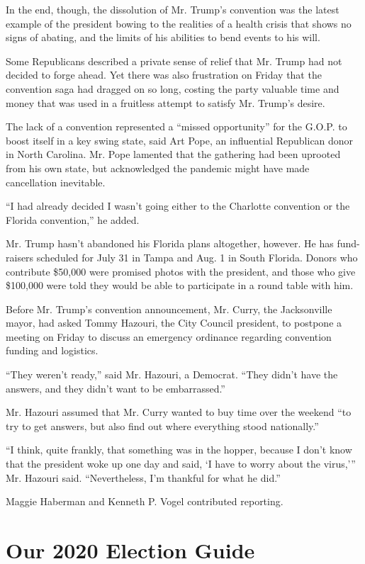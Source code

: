 In the end, though, the dissolution of Mr. Trump's convention was the
latest example of the president bowing to the realities of a health
crisis that shows no signs of abating, and the limits of his abilities
to bend events to his will.

Some Republicans described a private sense of relief that Mr. Trump had
not decided to forge ahead. Yet there was also frustration on Friday
that the convention saga had dragged on so long, costing the party
valuable time and money that was used in a fruitless attempt to satisfy
Mr. Trump's desire.

The lack of a convention represented a ``missed opportunity'' for the
G.O.P. to boost itself in a key swing state, said Art Pope, an
influential Republican donor in North Carolina. Mr. Pope lamented that
the gathering had been uprooted from his own state, but acknowledged the
pandemic might have made cancellation inevitable.

``I had already decided I wasn't going either to the Charlotte
convention or the Florida convention,'' he added.

Mr. Trump hasn't abandoned his Florida plans altogether, however. He has
fund-raisers scheduled for July 31 in Tampa and Aug. 1 in South Florida.
Donors who contribute \$50,000 were promised photos with the president,
and those who give \$100,000 were told they would be able to participate
in a round table with him.

Before Mr. Trump's convention announcement, Mr. Curry, the Jacksonville
mayor, had asked Tommy Hazouri, the City Council president, to postpone
a meeting on Friday to discuss an emergency ordinance regarding
convention funding and logistics.

``They weren't ready,'' said Mr. Hazouri, a Democrat. ``They didn't have
the answers, and they didn't want to be embarrassed.''

Mr. Hazouri assumed that Mr. Curry wanted to buy time over the weekend
``to try to get answers, but also find out where everything stood
nationally.''

``I think, quite frankly, that something was in the hopper, because I
don't know that the president woke up one day and said, `I have to worry
about the virus,''' Mr. Hazouri said. ``Nevertheless, I'm thankful for
what he did.''

Maggie Haberman and Kenneth P. Vogel contributed reporting.

\hypertarget{our-2020-election-guide}{%
\section{Our 2020 Election Guide}\label{our-2020-election-guide}}

